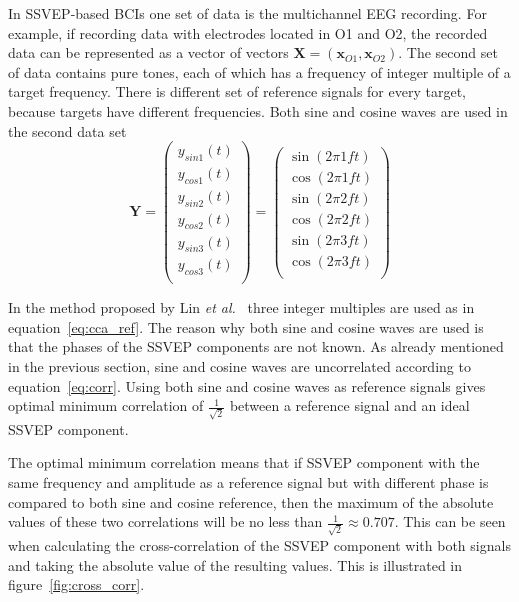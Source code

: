 In \gls{SSVEP}-based \glspl{BCI} one set of data is the multichannel \gls{EEG} recording. For example, if recording data with electrodes located in O1 and O2, the recorded data can be represented as a vector of vectors $\mathbf{X}=(\mathbf{x}_{O1}, \mathbf{x}_{O2})$. The second set of data contains \glspl{pure tone}, each of which has a frequency of integer multiple of a \gls{target} frequency. There is different set of \glspl{reference signal} for every \gls{target}, because \glspl{target} have different frequencies. Both sine and cosine waves are used in the second data set
\begin{equation}
	\label{eq:cca_ref}
	\mathbf{Y}=\begin{pmatrix}
		y_{sin1}(t)\\
		y_{cos1}(t)\\
		y_{sin2}(t)\\
		y_{cos2}(t)\\
		y_{sin3}(t)\\
		y_{cos3}(t)\\
	\end{pmatrix}=\begin{pmatrix}
		\sin(2\pi 1ft)\\
		\cos(2\pi 1ft)\\
		\sin(2\pi 2ft)\\
		\cos(2\pi 2ft)\\
		\sin(2\pi 3ft)\\
		\cos(2\pi 3ft)\\
	\end{pmatrix}
\end{equation}

In the method proposed by Lin \textit{et al.}~\cite{cca_lin} three integer multiples are used as in equation~\ref{eq:cca_ref}. The reason why both sine and cosine waves are used is that the phases of the \gls{SSVEP} components are not known. As already mentioned in the previous section, sine and cosine waves are uncorrelated according to equation~\ref{eq:corr}. Using both sine and cosine waves as \glspl{reference signal} gives optimal minimum \gls{correlation} of $\frac{1}{\sqrt{2}}$ between a \gls{reference signal} and an ideal \gls{SSVEP} component.

The optimal minimum \gls{correlation} means that if \gls{SSVEP} component with the same frequency and amplitude as a \gls{reference signal} but with different phase is compared to both sine and cosine reference, then the maximum of the absolute values of these two \glspl{correlation} will be no less than $\frac{1}{\sqrt{2}}\approx 0.707$. This can be seen when calculating the \gls{cross-correlation} of the \gls{SSVEP} component with both signals and taking the absolute value of the resulting values. This is illustrated in figure~\ref{fig:cross_corr}.


